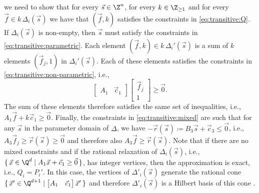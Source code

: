 we need to show that for every $\vec s \in \Z^n$, for every
$k \in \Z_{\ge 1}$ and for every $\vec f \in k \, \Delta_i(\vec s)$
we have that
$(\vec f, k)$ satisfies the constraints in \eqref{eq:transitive:Q}.
If $\Delta_i(\vec s)$ is non-empty, then $\vec s$ must satisfy
the constraints in \eqref{eq:transitive:parametric}.
Each element $(\vec f, k) \in k \, \Delta_i'(\vec s)$ is a sum
of $k$ elements $(\vec f_j, 1)$ in $\Delta_i'(\vec s)$.
Each of these elements satisfies the constraints in
\eqref{eq:transitive:non-parametric}, i.e.,
$$
\left[
\begin{matrix}
A_1 & \vec c_1
\end{matrix}
\right]
\left[
\begin{matrix}
\vec f_j \\ 1
\end{matrix}
\right]
\ge \vec 0
.
$$
The sum of these elements therefore satisfies the same set of inequalities,
i.e., $A_1 \vec f + k \vec c_1 \geq \vec 0$.
Finally, the constraints in \eqref{eq:transitive:mixed} are such
that for any $\vec s$ in the parameter domain of $\Delta$,
we have $-\vec r(\vec s) \coloneqq B_3 \vec s + \vec c_3 \le \vec 0$,
i.e., $A_3 \vec f_j \ge \vec r(\vec s) \ge \vec 0$
and therefore also $A_3 \vec f \ge \vec r(\vec s)$.
Note that if there are no mixed constraints and if the
rational relaxation of $\Delta_i(\vec s)$, i.e.,
$\{\, \vec x \in \Q^d \mid A_1 \vec x + \vec c_1 \ge \vec 0\,\}$,
has integer vertices, then the approximation is exact, i.e.,
$Q_i = P_i'$.  In this case, the vertices of $\Delta'_i(\vec s)$
generate the rational cone
$\{\, \vec x' \in \Q^{d+1} \mid \left[
\begin{matrix}
A_1 & \vec c_1
\end{matrix}
\right] \vec x' \,\}$ and therefore $\Delta'_i(\vec s)$ is
a Hilbert basis of this cone .

